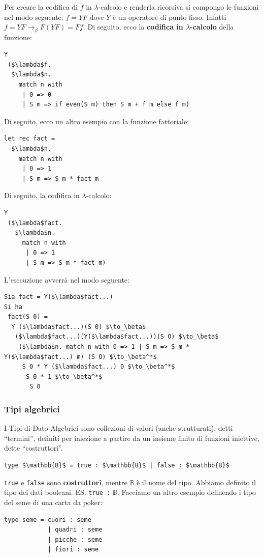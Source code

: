 \documentclass{article}
\begin{document}
\bigskip

Per creare la codifica di $f$ in $\lambda$-calcolo e renderla ricorsiva si compongo le funzioni nel modo seguente: $f = YF$ dove $Y$ è un operatore di punto fisso. Infatti $f = YF\to_\beta F(YF) = Ff$. Di seguito, ecco la \textbf{codifica in $\lambda$-calcolo} della funzione:
\begin{lstlisting}[mathescape=true]
Y
 ($\lambda$f.
  $\lambda$n.
    match n with
     | 0 => 0
     | S m => if even(S m) then S m + f m else f m)
\end{lstlisting}

\bigskip

Di seguito, ecco un altro esempio con la funzione fattoriale:
\begin{lstlisting}[mathescape=true]
let rec fact =
  $\lambda$n.
    match n with
     | 0 => 1
     | S m => S m * fact m
\end{lstlisting}

Di seguito, la codifica in $\lambda$-calcolo:
\begin{lstlisting}[mathescape=true]
Y
 ($\lambda$fact.
   $\lambda$n.
     match n with
      | 0 => 1
      | S m => S m * fact m)
\end{lstlisting}
L'esecuzione avverrà nel modo seguente:
\begin{lstlisting}[mathescape=true]
Sia fact = Y($\lambda$fact...)
Si ha
 fact(S 0) =
  Y ($\lambda$fact...)(S 0) $\to_\beta$
   ($\lambda$fact...)(Y($\lambda$fact...))(S O) $\to_\beta$
    ($\lambda$n. match n with 0 => 1 | S m => S m * Y($\lambda$fact...) m) (S O) $\to_\beta^*$
     S 0 * Y ($\lambda$fact...) 0 $\to_\beta^*$
      S 0 * 1 $\to_\beta^*$
       S 0
\end{lstlisting}

\subsubsection{Tipi algebrici}
I Tipi di Dato Algebrici sono collezioni di valori (anche strutturati), detti ``termini”, definiti per iniezione a partire da un insieme finito di funzioni iniettive, dette ``costruttori”.
\begin{lstlisting}[mathescape=true]
type $\mathbb{B}$ = true : $\mathbb{B}$ | false : $\mathbb{B}$
\end{lstlisting}
\verb|true| e \verb|false| sono {\color{red}\textbf{costruttori}}, mentre $\mathbb{B}$ è il nome del tipo. Abbiamo definito il tipo dei dati booleani. ES: \verb|true :| $\mathbb{B}$. Facciamo un altro esempio definendo i tipo del seme di una carta da poker:
\begin{lstlisting}[mathescape=true]
type seme = cuori : seme
            | quadri : seme
            | picche : seme
            | fiori : seme
\end{lstlisting}
\end{document}
